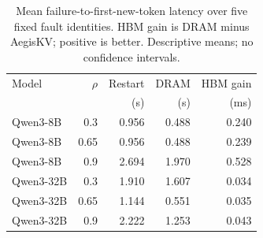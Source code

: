\begin{table}[t]
\centering
\setlength{\tabcolsep}{3pt}
\renewcommand{\arraystretch}{1.08}
\caption{Mean failure-to-first-new-token latency over five fixed fault identities. HBM gain is DRAM minus AegisKV; positive is better. Descriptive means; no confidence intervals.}
\label{tab:agent-failure-latency}
\begin{tabular}{@{}lrrrr@{}}
\hline
Model & $\rho$ & Restart & DRAM & HBM gain \\
 & & (s) & (s) & (ms) \\
\hline
Qwen3-8B & 0.3 & 0.956 & 0.488 & 0.240 \\
Qwen3-8B & 0.65 & 0.956 & 0.488 & 0.239 \\
Qwen3-8B & 0.9 & 2.694 & 1.970 & 0.528 \\
Qwen3-32B & 0.3 & 1.910 & 1.607 & 0.034 \\
Qwen3-32B & 0.65 & 1.144 & 0.551 & 0.035 \\
Qwen3-32B & 0.9 & 2.222 & 1.253 & 0.043 \\
\hline
\end{tabular}
\end{table}
